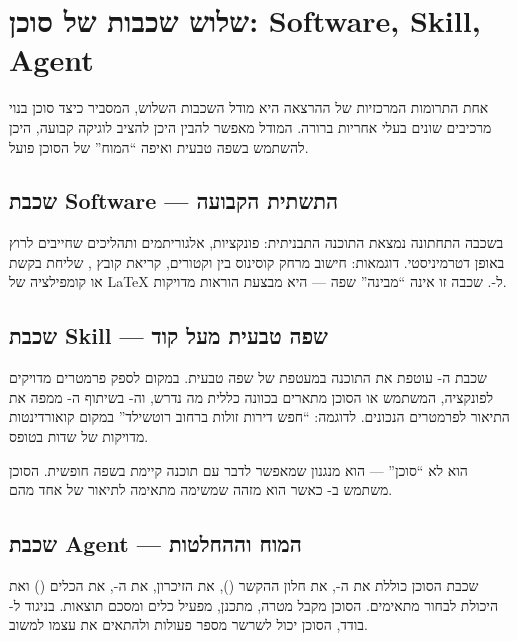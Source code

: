 \section{שלוש שכבות של סוכן: Software, Skill, Agent}

אחת התרומות המרכזיות של ההרצאה היא מודל השכבות השלוש, המסביר כיצד סוכן
 בנוי מרכיבים שונים בעלי אחריות ברורה. המודל מאפשר להבין היכן
להציב לוגיקה קבועה, היכן להשתמש בשפה טבעית ואיפה ``המוח'' של הסוכן פועל.



\subsection{שכבת Software --- התשתית הקבועה}

בשכבה התחתונה נמצאת התוכנה התבניתית: פונקציות, אלגוריתמים ותהליכים שחייבים
לרוץ באופן דטרמיניסטי. דוגמאות: חישוב מרחק קוסינוס בין וקטורים, קריאת קובץ
, שליחת בקשת  או קומפילציה של \LaTeX{} ל-.
שכבה זו אינה ``מבינה'' שפה --- היא מבצעת הוראות מדויקות.

\subsection{שכבת Skill --- שפה טבעית מעל קוד}

שכבת ה- עוטפת את התוכנה במעטפת של שפה טבעית. במקום לספק
פרמטרים מדויקים לפונקציה, המשתמש או הסוכן מתארים בכוונה כללית מה נדרש,
וה- בשיתוף ה- ממפה את התיאור לפרמטרים הנכונים.
לדוגמה: ``חפש דירות זולות ברחוב רוטשילד'' במקום קואורדינטות מדויקות של
שדות בטופס.

\begin{insightbox}
 הוא לא ``סוכן'' --- הוא מנגנון שמאפשר לדבר עם תוכנה קיימת
בשפה חופשית. הסוכן משתמש ב- כאשר הוא מזהה שמשימה מתאימה
לתיאור של אחד מהם.
\end{insightbox}

\subsection{שכבת Agent --- המוח וההחלטות}

שכבת הסוכן כוללת את ה-, את חלון ההקשר (),
את הזיכרון, את ה-, את הכלים () ואת היכולת לבחור
 מתאימים. הסוכן מקבל מטרה, מתכנן, מפעיל כלים ומסכם תוצאות.
בניגוד ל- בודד, הסוכן יכול לשרשר מספר פעולות ולהתאים את עצמו
למשוב.

